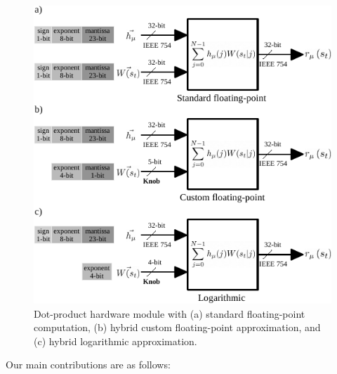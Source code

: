 \begin{figure}
	\includegraphics[width=\columnwidth]{../figures/dot-product_unit.pdf}
	\caption{Dot-product hardware module with (a) standard floating-point computation, (b) hybrid custom floating-point approximation, and (c) hybrid logarithmic approximation.}
	\label{fig:dot_product_unit}
\end{figure}

Our main contributions are as follows:

